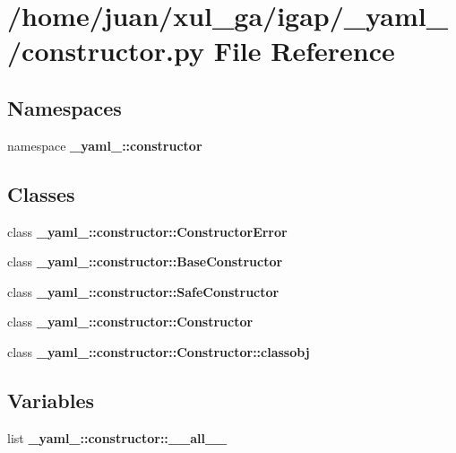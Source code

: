 \section{/home/juan/xul\_\-ga/igap/\_\-yaml\_\-/constructor.py File Reference}
\label{constructor_8py}
\subsection*{Namespaces}
\begin{CompactItemize}
\item 
namespace {\bf \_\-yaml\_\-::constructor}
\end{CompactItemize}
\subsection*{Classes}
\begin{CompactItemize}
\item 
class {\bf \_\-yaml\_\-::constructor::ConstructorError}
\item 
class {\bf \_\-yaml\_\-::constructor::BaseConstructor}
\item 
class {\bf \_\-yaml\_\-::constructor::SafeConstructor}
\item 
class {\bf \_\-yaml\_\-::constructor::Constructor}
\item 
class {\bf \_\-yaml\_\-::constructor::Constructor::classobj}
\end{CompactItemize}
\subsection*{Variables}
\begin{CompactItemize}
\item 
list {\bf \_\-yaml\_\-::constructor::\_\-\_\-all\_\-\_\-}
\end{CompactItemize}
